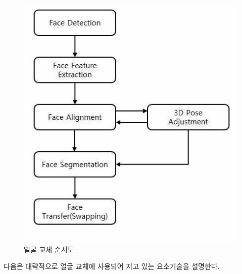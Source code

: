 \documentclass{oblivoir}
\begin{document}
\begin{figure}[h!]
  \centering
    \includegraphics{pic/chp1/img371}
  \caption{얼굴 교체 순서도}
\end{figure}

다음은 대략적으로 얼굴 교체에 사용되어 지고 있는 요소기술을 설명한다.
\end{document}
